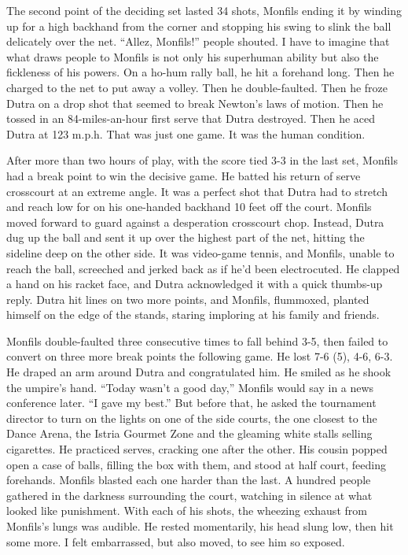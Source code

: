 The second point of the deciding set lasted 34 shots, Monfils ending it
by winding up for a high backhand from the corner and stopping his swing
to slink the ball delicately over the net. ``Allez, Monfils!'' people
shouted. I have to imagine that what draws people to Monfils is not only
his superhuman ability but also the fickleness of his powers. On a
ho-hum rally ball, he hit a forehand long. Then he charged to the net to
put away a volley. Then he double-faulted. Then he froze Dutra on a drop
shot that seemed to break Newton's laws of motion. Then he tossed in an
84-miles-an-hour first serve that Dutra destroyed. Then he aced Dutra at
123 m.p.h. That was just one game. It was the human condition.

After more than two hours of play, with the score tied 3-3 in the last
set, Monfils had a break point to win the decisive game. He batted his
return of serve crosscourt at an extreme angle. It was a perfect shot
that Dutra had to stretch and reach low for on his one-handed backhand
10 feet off the court. Monfils moved forward to guard against a
desperation crosscourt chop. Instead, Dutra dug up the ball and sent it
up over the highest part of the net, hitting the sideline deep on the
other side. It was video-game tennis, and Monfils, unable to reach the
ball, screeched and jerked back as if he'd been electrocuted. He clapped
a hand on his racket face, and Dutra acknowledged it with a quick
thumbs-up reply. Dutra hit lines on two more points, and Monfils,
flummoxed, planted himself on the edge of the stands, staring imploring
at his family and friends.

Monfils double-faulted three consecutive times to fall behind 3-5, then
failed to convert on three more break points the following game. He lost
7-6 (5), 4-6, 6-3. He draped an arm around Dutra and congratulated him.
He smiled as he shook the umpire's hand. ``Today wasn't a good day,''
Monfils would say in a news conference later. ``I gave my best.'' But
before that, he asked the tournament director to turn on the lights on
one of the side courts, the one closest to the Dance Arena, the Istria
Gourmet Zone and the gleaming white stalls selling cigarettes. He
practiced serves, cracking one after the other. His cousin popped open a
case of balls, filling the box with them, and stood at half court,
feeding forehands. Monfils blasted each one harder than the last. A
hundred people gathered in the darkness surrounding the court, watching
in silence at what looked like punishment. With each of his shots, the
wheezing exhaust from Monfils's lungs was audible. He rested
momentarily, his head slung low, then hit some more. I felt embarrassed,
but also moved, to see him so exposed.

